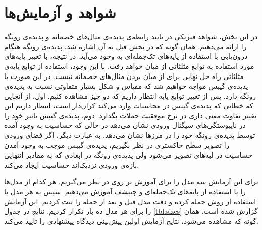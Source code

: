 \documentclass[12pt,onecolumn,a4paper]{article}
\begin{document}
\section{شواهد و آزمایش‌ها}
در این بخش، شواهد فیزیکی در تایید رابطه‌ی پدیده‌ی مثال‌های خصمانه و پدیده‌ی رونگه را ارائه می‌دهیم. همان گونه که در بخش قبل به آن اشاره شد، پدیده‌ی رونگه هنگام درون‌یابی با استفاده از پایه‌های تک‌جمله‌ای به وجود می‌آید. در نتیجه، با تغییر پایه‌های مورد استفاده به توابع مثلثاتی از میان خواهد رفت. با این وجود، استفاده از توابع پایه‌ی مثلثاتی راه حل نهایی برای از میان بردن مثال‌های خصمانه نیست. در این صورت با پدیده‌ی گیبس مواجه خواهیم شد که مقیاس و شکل بسیار متفاوتی نسبت به پدیده‌ی رونگه دارد. پس از تغییر توابع پایه‌ انتظار داریم که دو چیز مشاهده کنیم. اول، از آنجایی که خطایی که پدیده‌ی گیبس در محاسبات وارد می‌کند کران‌دار است، انتظار داریم این تغییر تفاوت معنی داری در نرخ موفقیت حملات بگذارد. دوم، پدیده‌ی گیبس تاثیر خود را در ناپیوستگی‌های سیگنال ورودی نشان می‌دهد در حالی که حساسیت به وجود آمده توسط پدیده‌ی رونگه خود را در مرزها نشان می‌دهد. به عبارت دیگر، اگر فضای ورودی را تصویر سطح خاکستری در نظر بگیریم، پدیده‌ی گیبس موجب به وجود آمدن حساسیت در لبه‌های تصویر می‌شود ولی پدیده‌ی رونگه در ابعادی که به مقادیر انتهایی بازه‌ی ورودی نزدیک‌اند حساسیت ایجاد می‌کند.

برای این آزمایش سه مدل را برای آموزش بر روی
در نظر می‌گیریم. هر کدام از مدل‌ها را با استفاده از پایه‌های تک‌جمله‌ای و چبیشف آموزش می‌دهیم. سپس به هر مدل با استفاده از روش
حمله کرده و  دقت مدل قبل و بعد از حمله را ثبت کردیم. این آزمایش را برای هر مدل ده بار تکرار کردیم. نتایج در جدول
\ref{tbl:sizes}
گزارش شده است. همان گونه که مشاهده می‌شود، نتایج آزمایش اولین پیش‌بینی دیدگاه پیشنهادی را تایید می‌کند.
\end{document}
